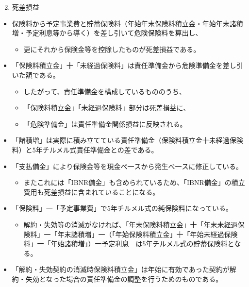\documentclass[report,gutter=10mm,fore-edge=10mm,uplatex,dvipdfmx]{jlreq}
\begin{document}
\begin{enumerate}
\setcounter{enumi}{1}
\tightlist
\item
  死差損益
\end{enumerate}

\begin{itemize}
\tightlist
\item
  保険料から予定事業費と貯蓄保険料（年始年末保険料積立金・年始年末諸積増・予定利息等から導く）を差し引いて危険保険料を算出し、

  \begin{itemize}
  \tightlist
  \item
    更にそれから保険金等を控除したものが死差損益である。
  \end{itemize}
\item
  「保険料積立金」十「未経過保険料」は責任準備金から危険準備金を差し引いた額である。

  \begin{itemize}
  \tightlist
  \item
    したがって、責任準備金を構成しているもののうち、
  \item
    「保険料積立金」「未経過保険料」部分は死差損益に、
  \item
    「危険準備金」は責任準備金関係損益に反映される。
  \end{itemize}
\item
  「諸積増」は実際に積み立てている責任準備金（保険料積立金十未経過保険料）と5年チルメル式責任準備金との差である。
\item
  「支払備金」により保険金等を現金べ一スから発生べ一スに修正している。

  \begin{itemize}
  \tightlist
  \item
    またこれには「IBNR備金」も含められているため、「IBNR備金」の積立費用も死差損益に含まれていることになる。
  \end{itemize}
\item
  「保険料」一「予定事業費」で5年チルメル式の純保険料になっている。

  \begin{itemize}
  \tightlist
  \item
    解約・失効等の消滅がなければ、「年末保険料積立金」十「年末未経過保険料」一「年末諸積増」一（「年始保険料積立金」十「年始未経過保険料」一「年始諸積増」）一予定利息　は5年チルメル式の貯蓄保険料となる。
  \end{itemize}
\item
  「解約・失効契約の消滅時保険料積立金」は年始に有効であった契約が解約・失効となった場合の責任準備金の調整を行うためのものである。


\end{itemize}
\end{document}
